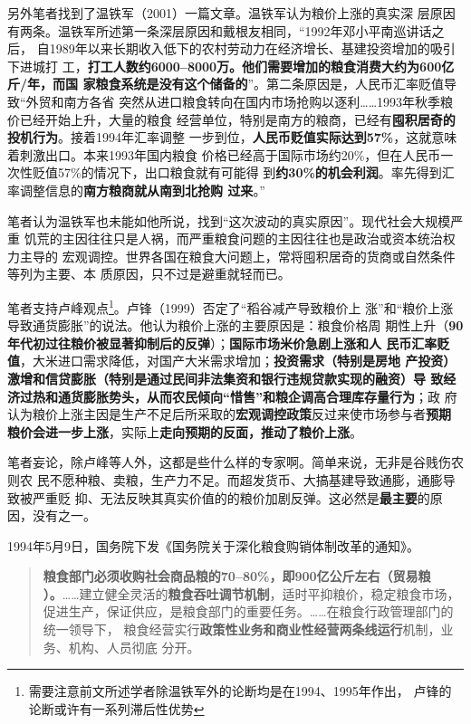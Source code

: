 另外笔者找到了温铁军（2001）一篇文章\cite{6cibodong}。温铁军认为粮价上涨的真实深
层原因有两条。温铁军所述第一条深层原因和戴根友相同，“1992年邓小平南巡讲话之后，
自1989年以来长期收入低下的农村劳动力在经济增长、基建投资增加的吸引下进城打
工，\textbf{打工人数约6000--8000万。他们需要增加的粮食消费大约为600亿斤/年，而国
  家粮食系统是没有这个储备的}”。第二条原因是，人民币汇率贬值导致“外贸和南方各省
突然从进口粮食转向在国内市场抢购以逐利……1993年秋季粮价已经开始上升，大量的粮食
经营单位，特别是南方的粮商，已经有\textbf{囤积居奇的投机行为}。接着1994年汇率调整
一步到位，\textbf{人民币贬值实际达到57\%}，这就意味着刺激出口。本来1993年国内粮食
价格已经高于国际市场约20\%，但在人民币一次性贬值57\%的情况下，出口粮食就有可能得
到\textbf{约30\%的机会利润}。率先得到汇率调整信息的\textbf{南方粮商就从南到北抢购
  过来}。”

笔者认为温铁军也未能如他所说，找到“这次波动的真实原因”。现代社会大规模严重
饥荒的主因往往只是人祸，而严重粮食问题的主因往往也是政治或资本统治权力主导的
宏观调控。世界各国在粮食大问题上，常将囤积居奇的货商或自然条件等列为主要、本
质原因，只不过是避重就轻而已。

笔者支持卢峰观点\footnote{需要注意前文所述学者除温铁军外的论断均是在1994、1995年作出，
  卢锋的论断或许有一系列滞后性优势}。卢锋（1999）否定了“稻谷减产导致粮价上
涨”和“粮价上涨导致通货膨胀”的说法。他认为粮价上涨的主要原因是：粮食价格周
期性上升（\textbf{90年代初过往粮价被显著抑制后的反弹}）；\textbf{国际市场米价急剧上涨和人
  民币汇率贬值}，大米进口需求降低，对国产大米需求增加；\textbf{投资需求（特别是房地
  产投资）激增和信贷膨胀（特别是通过民间非法集资和银行违规贷款实现的融资）导
  致经济过热和通货膨胀势头，从而农民倾向“惜售”和粮企调高合理库存量行为}；政
府认为粮价上涨主因是生产不足后所采取的\textbf{宏观调控政策}反过来使市场参与者\textbf{预期
  粮价会进一步上涨}，实际上\textbf{走向预期的反面，推动了粮价上涨}。

笔者妄论，除卢峰等人外，这都是些什么样的专家啊。简单来说，无非是谷贱伤农则农
民不愿种粮、卖粮，生产力不足。而超发货币、大搞基建导致通膨，通膨导致被严重贬
抑、无法反映其真实价值的的粮价加剧反弹。这必然是\textbf{最主要}的原因，没有之一。

1994年5月9日，国务院下发《国务院关于深化粮食购销体制改革的通知》。
\begin{quotation}
  \textbf{粮食部门必须收购社会商品粮的70--80\%，即900亿公斤左右（贸易粮
    ）。}……建立健全灵活的\textbf{粮食吞吐调节机制}，适时平抑粮价，稳定粮食市场，
  促进生产，保证供应，是粮食部门的重要任务。……在粮食行政管理部门的统一领导下，
  粮食经营实行\textbf{政策性业务和商业性经营两条线运行}机制，业务、机构、人员彻底
  分开。
\end{quotation}


